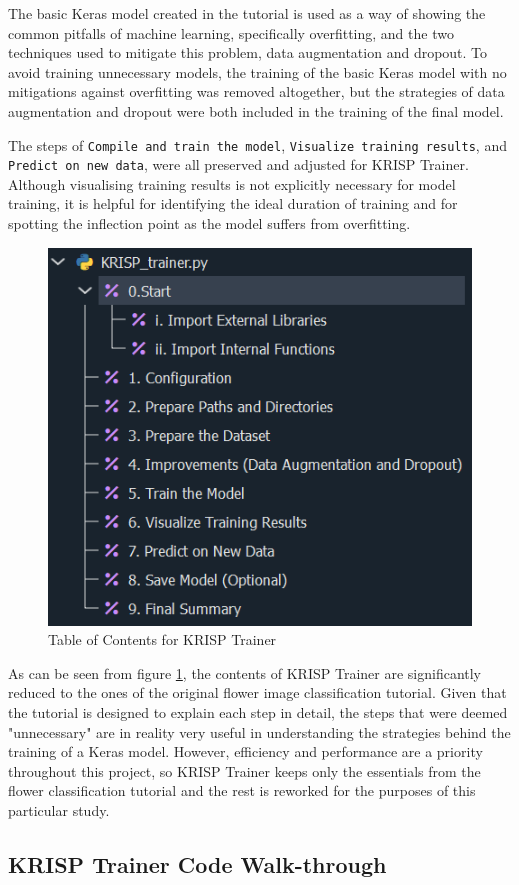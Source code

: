 The basic Keras model created in the tutorial is used as a way of showing the common pitfalls of machine learning, specifically overfitting, and the two techniques used to mitigate this problem, data augmentation and dropout. To avoid training unnecessary models, the training of the basic Keras model with no mitigations against overfitting was removed altogether, but the strategies of data augmentation and dropout were both included in the training of the final model. 

The steps of \verb|Compile and train the model|, \verb|Visualize training results|, and \verb|Predict on new data|, were all preserved and adjusted for KRISP Trainer. Although visualising training results is not explicitly necessary for model training, it is helpful for identifying the ideal duration of training and for spotting the inflection point as the model suffers from overfitting. 

\begin{figure}
    \centering
    \includegraphics[width=0.5\linewidth]{contents/figures/ME KRISP trainer outline.jpg}
    \caption{Table of Contents for KRISP Trainer \citep{imageclassification_2024}}
    \label{fig:ME outline krisp trainer}
\end{figure}

As can be seen from figure \ref{fig:ME outline krisp trainer}, the contents of KRISP Trainer are significantly reduced to the ones of the original flower image classification tutorial. Given that the tutorial is designed to explain each step in detail, the steps that were deemed "unnecessary" are in reality very useful in understanding the strategies behind the training of a Keras model. However, efficiency and performance are a priority throughout this project, so KRISP Trainer keeps only the essentials from the flower classification tutorial and the rest is reworked for the purposes of this particular study. 

\subsection{KRISP Trainer Code Walk-through}


